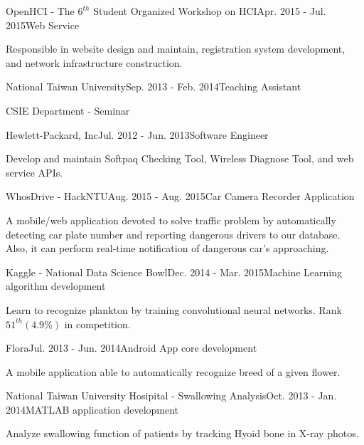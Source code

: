 \documentclass{joel_cv}
\begin{document}
\begin{sectionContentNormal}{OpenHCI - The $6^{th}$ Student Organized Workshop on HCI}{Apr. 2015 - Jul. 2015}{Web Service}
	\item Responsible in website design and maintain, registration system development, and network infrastructure construction.
\end{sectionContentNormal}

\begin{sectionContentNormal}{National Taiwan University}{Sep. 2013 - Feb. 2014}{Teaching Assistant}
	\item CSIE Department - Seminar
\end{sectionContentNormal}

\begin{sectionContentNormal}{Hewlett-Packard, Inc}{Jul. 2012 - Jun. 2013}{Software Engineer}
	\item Develop and maintain Softpaq Checking Tool, Wireless Diagnose Tool, and web service APIs.
\end{sectionContentNormal}

%
%


\begin{sectionContentNormal}{WhosDrive - HackNTU}{Aug. 2015 - Aug. 2015}{Car Camera Recorder Application}
	\item A mobile/web application devoted to solve traffic problem by automatically detecting car plate number and reporting dangerous drivers to our database. Also, it can perform real-time notification of dangerous car's approaching.
\end{sectionContentNormal}

\begin{sectionContentNormal}{Kaggle - National Data Science Bowl}{Dec. 2014 - Mar. 2015}{Machine Learning algorithm development}
	\item Learn to recognize plankton by training convolutional neural networks. Rank $51^{th} (4.9\%)$ in competition.
\end{sectionContentNormal}

\begin{sectionContentNormal}{Flora}{Jul. 2013 - Jun. 2014}{Android App core development}
	\item A mobile application able to automatically recognize breed of a given flower.
\end{sectionContentNormal}

\begin{sectionContentNormal}{National Taiwan University Hosipital - Swallowing Analysis}{Oct. 2013 - Jan. 2014}{MATLAB application development}
	\item Analyze swallowing function of patients by tracking Hyoid bone in X-ray photos.
\end{sectionContentNormal}
\end{document}
